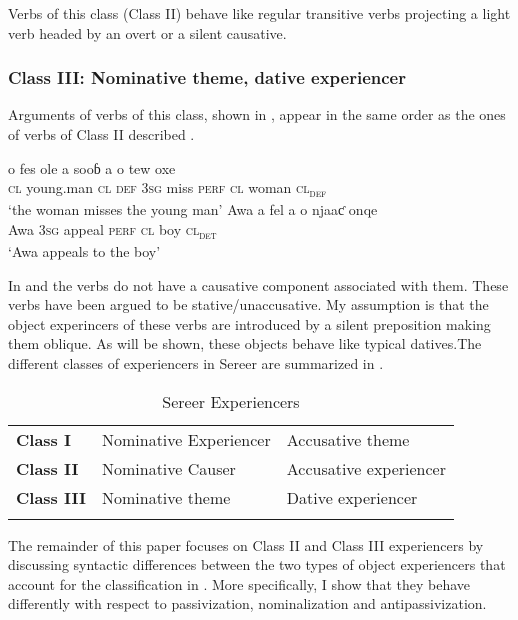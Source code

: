 \documentclass[output=paper]{langscibook}
\begin{document}
Verbs of this class (Class II) behave like regular transitive verbs projecting a light verb headed by an overt or a silent causative.

\subsubsection{Class III: Nominative theme, dative experiencer}

Arguments of verbs of this class, shown in , appear in the same order as the ones of verbs of Class II described .

\ea \label{ex:tamba:7}
\ea \label{ex:tamba:7a}
\gll o  fes              ole         a          sooɓ  a        o  tew        oxe\\
    \textsc{cl} young.man  \textsc{cl\textsubscript{} \textsc{def}}    \textsc{3sg}       miss  \textsc{perf}   \textsc{cl}  woman \textsc{cl\textsubscript{def}}\\
\glt `the woman  misses the young man'
\ex \label{ex:tamba:7b}
\gll Awa a     fel         a       o     njaaƈ onqe\\
Awa 3\textsc{sg} appeal \textsc{perf}  \textsc{cl}   boy   \textsc{cl\textsubscript{det} }\\
\glt `Awa appeals to the boy'
\z
\z

In  and  the verbs do not have a causative component associated with them. These verbs have been argued to be stative/unaccusative. My assumption is that the object experincers of these verbs are introduced by a silent preposition making them oblique. As will be shown, these objects behave like typical datives.The different classes of experiencers in Sereer are summarized in .
 
\begin{table}
\caption{Sereer Experiencers}
\label{tab:tamba:2}
\begin{tabular}{lll}
\lsptoprule
\textbf{Class I} & Nominative Experiencer & Accusative theme\\
\textbf{Class II} & Nominative Causer & Accusative experiencer\\
\textbf{Class III} & Nominative theme & Dative experiencer\\
\lspbottomrule
\end{tabular}
\end{table}

The remainder of this paper focuses on Class II and Class III experiencers by discussing syntactic differences between the two types of object experiencers that account for the classification in . More specifically, I show that they behave differently with respect to passivization, nominalization and antipassivization.
\end{document}
